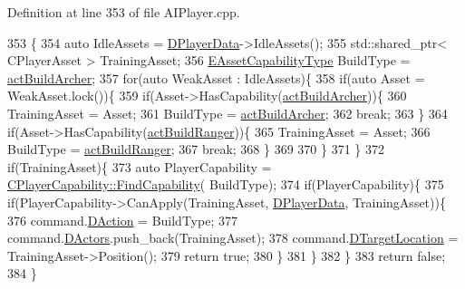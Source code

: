Definition at line 353 of file A\+I\+Player.\+cpp.


\begin{DoxyCode}
353                                                          \{
354     \textcolor{keyword}{auto} IdleAssets = \hyperlink{classCAIPlayer_a83b5113c8f7e80df54940b647c5ee2e6}{DPlayerData}->IdleAssets();
355     std::shared\_ptr< CPlayerAsset > TrainingAsset;
356     \hyperlink{GameDataTypes_8h_a35b98ce26aca678b03c6f9f76e4778ce}{EAssetCapabilityType} BuildType = \hyperlink{GameDataTypes_8h_a35b98ce26aca678b03c6f9f76e4778ceae3af0123db77607fb381df7e49c5b48b}{actBuildArcher};
357     \textcolor{keywordflow}{for}(\textcolor{keyword}{auto} WeakAsset : IdleAssets)\{
358         \textcolor{keywordflow}{if}(\textcolor{keyword}{auto} Asset = WeakAsset.lock())\{
359             \textcolor{keywordflow}{if}(Asset->HasCapability(\hyperlink{GameDataTypes_8h_a35b98ce26aca678b03c6f9f76e4778ceae3af0123db77607fb381df7e49c5b48b}{actBuildArcher}))\{
360                 TrainingAsset = Asset;
361                 BuildType = \hyperlink{GameDataTypes_8h_a35b98ce26aca678b03c6f9f76e4778ceae3af0123db77607fb381df7e49c5b48b}{actBuildArcher};
362                 \textcolor{keywordflow}{break};
363             \}
364             \textcolor{keywordflow}{if}(Asset->HasCapability(\hyperlink{GameDataTypes_8h_a35b98ce26aca678b03c6f9f76e4778cead539d31a3eb945161800e6342a05fb11}{actBuildRanger}))\{
365                 TrainingAsset = Asset;
366                 BuildType = \hyperlink{GameDataTypes_8h_a35b98ce26aca678b03c6f9f76e4778cead539d31a3eb945161800e6342a05fb11}{actBuildRanger};
367                 \textcolor{keywordflow}{break};
368             \}
369             
370         \}
371     \}
372     \textcolor{keywordflow}{if}(TrainingAsset)\{
373         \textcolor{keyword}{auto} PlayerCapability = \hyperlink{classCPlayerCapability_a881ba4b87385d7cfe5cb6ced2d26f226}{CPlayerCapability::FindCapability}(
      BuildType); 
374         \textcolor{keywordflow}{if}(PlayerCapability)\{
375             \textcolor{keywordflow}{if}(PlayerCapability->CanApply(TrainingAsset, \hyperlink{classCAIPlayer_a83b5113c8f7e80df54940b647c5ee2e6}{DPlayerData}, TrainingAsset))\{
376                 command.\hyperlink{structSPlayerCommandRequest_a80897bbccf2c4e0b148a7aa815a926c6}{DAction} = BuildType;
377                 command.\hyperlink{structSPlayerCommandRequest_aa37fc01519676345703d78b9f573894a}{DActors}.push\_back(TrainingAsset);       
378                 command.\hyperlink{structSPlayerCommandRequest_a701702b94ca2fd2738e95ef6711dd41a}{DTargetLocation} = TrainingAsset->Position();
379                 \textcolor{keywordflow}{return} \textcolor{keyword}{true};
380             \}
381         \}
382     \}
383     \textcolor{keywordflow}{return} \textcolor{keyword}{false};
384 \}
\end{DoxyCode}
